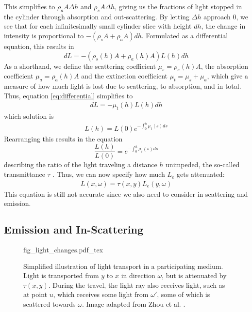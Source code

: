 This simplifies to ${\rho}_aA{\Delta}h$ and ${\rho}_sA{\Delta}h$, giving us the fractions of light stopped in the cylinder through absorption and out-scattering. By letting $\Delta h$ approach 0, we see that for each infinitesimally small cylinder slice with height $dh$, the change in intensity is proportional to $-({\rho}_sA + {\rho}_aA)dh$.
Formulated as a differential equation, this results in
\begin{equation} \label{eq:differential}
dL = -({\rho}_s(h)A + {\rho}_a(h)A)L(h)dh
\end{equation}
As a shorthand, we define the scattering coefficient ${\mu}_s ={\rho}_s(h)A $, the absorption coefficient ${\mu}_a = {\rho}_a(h)A$ and the extinction coefficient ${\mu}_t = {\mu}_s +{\mu}_a$, which give a measure of how much light is lost due to scattering, to absorption, and in total. Thus, equation \ref{eq:differential} simplifies to
\begin{align*}
dL = - {\mu}_t(h)L(h)dh
\end{align*}
which solution is
\begin{align*}
L(h) = L(0)e^{-\int_{0}^{h} {\mu}_t(s)ds}
\end{align*}
Rearranging this results in the equation
\begin{equation} \label{eq:tau_definition}
\frac{L(h)}{L(0)} = e^{-\int_{0}^{h} {\mu}_t(s)ds}
\end{equation}
describing the ratio of the light traveling a distance $h$ unimpeded, the so-called transmittance $\tau$ .
Thus, we can now specify how much $L_e$ gets attenuated:
\begin{align*}
L({x},\omega ) =\tau({x}, {y}) L_e({y}, \omega )
\end{align*}
This equation is still not accurate since we also need to consider in-scattering and emission.
\subsection{Emission and In-Scattering}


\begin{figure}
\centering
\def\svgwidth{\columnwidth}
{fig_light_changes.pdf_tex}

\caption{Simplified illustration of light transport in a participating medium. Light is transported from $y$ to $x$ in direction $\omega$, but is attenuated by $\tau(x,y)$. During the travel, the light ray also receives light, such as at point $u$, which receives some light from $\omega'$, some of which is scattered towards $\omega$. Image adapted from Zhou et al. \cite{zhou2007real-time}.}
\label{fig:light_changes}
\end{figure}


